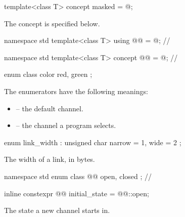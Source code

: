 %
\begin{itemdecl}
template<class T>
  concept masked = @\seebelow@;
\end{itemdecl}

\begin{itemdescr}
\pnum
\remarks
The concept is specified below.
\end{itemdescr}

\begin{codeblock}
namespace std {
  template<class T> using @@ = @\seebelow@; // \expos
}
\end{codeblock}

\begin{codeblock}
namespace std {
  template<class T>
  concept @@ = @\seebelow@; // \expos
}
\end{codeblock}

%
\begin{itemdecl}
enum class color { red, green };
\end{itemdecl}

\begin{itemdescr}
\pnum
\remarks
The enumerators have the following meanings:
\begin{itemize}
\item {} -- the default channel.
\item {} -- the channel a program selects.
\end{itemize}
\end{itemdescr}

%
\begin{itemdecl}
enum link_width : unsigned char { narrow = 1, wide = 2 };
\end{itemdecl}

\begin{itemdescr}
\pnum
\remarks
The width of a link, in bytes.
\end{itemdescr}

\begin{codeblock}
namespace std {
  enum class @@ { open, closed }; // \expos
}
\end{codeblock}

%
\begin{itemdecl}
inline constexpr @@ initial_state = @@::open;
\end{itemdecl}

\begin{itemdescr}
\pnum
\remarks
The state a new channel starts in.
\end{itemdescr}
